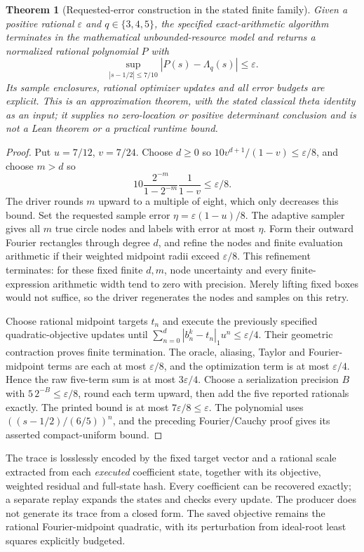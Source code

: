 \documentclass[11pt]{article}
\newtheorem{theorem}{Theorem}[section]
\theoremstyle{definition}\newtheorem{definition}[theorem]{Definition}
\theoremstyle{remark}\newtheorem{remark}[theorem]{Remark}
\begin{document}
\begin{theorem}[Requested-error construction in the stated finite family]\label{at:requested}
Given a positive rational $\varepsilon$ and $q\in\{3,4,5\}$, the specified
exact-arithmetic algorithm terminates in the mathematical unbounded-resource
model and returns a normalized rational polynomial $P$ with
\[
 \sup_{|s-1/2|\le7/10}|P(s)-\Lambda_q(s)|\le\varepsilon.
\]
Its sample enclosures, rational optimizer updates and all error budgets are
explicit. This is an approximation theorem, with the stated classical theta
identity as an input; it supplies no zero-location or positive determinant
conclusion and is not a Lean theorem or a practical runtime bound.
\end{theorem}
\begin{proof}
Put $u=7/12$, $v=7/24$. Choose $d\ge0$ so
$10v^{d+1}/(1-v)\le\varepsilon/8$, and choose $m>d$ so
\[
 10\frac{2^{-m}}{1-2^{-m}}\frac1{1-v}\le\varepsilon/8.
\]
The driver rounds $m$ upward to a multiple of eight, which only decreases
this bound. Set the requested sample error
$\eta=\varepsilon(1-u)/8$. The adaptive sampler gives all $m$ true circle
nodes and labels with error at most $\eta$. Form their outward Fourier
rectangles through degree $d$, and refine the nodes and finite evaluation
arithmetic if their weighted midpoint radii exceed $\varepsilon/8$.
This refinement terminates: for these fixed finite $d,m$, node uncertainty
and every finite-expression arithmetic width tend to zero with precision.
Merely lifting fixed boxes would not suffice, so the driver regenerates the
nodes and samples on this retry.

Choose rational midpoint targets $t_n$ and execute the previously specified
quadratic-objective updates until
$\sum_{n=0}^d|b_n^k-t_n|_1u^n\le\varepsilon/4$.
Their geometric contraction proves finite termination. The oracle,
aliasing, Taylor and Fourier-midpoint terms are each at most
$\varepsilon/8$, and the optimization term is at most $\varepsilon/4$.
Hence the raw five-term sum is at most $3\varepsilon/4$.
Choose a serialization precision $B$ with $5\,2^{-B}\le\varepsilon/8$,
round each term upward, then add the five reported rationals exactly.
The printed bound is at most $7\varepsilon/8\le\varepsilon$.
The polynomial uses $((s-1/2)/(6/5))^n$, and the preceding Fourier/Cauchy
proof gives its asserted compact-uniform bound.
\end{proof}

The trace is losslessly encoded by the fixed target vector and a rational
scale extracted from each \emph{executed} coefficient state, together with
its objective, weighted residual and full-state hash. Every coefficient
can be recovered exactly; a separate replay expands the states and checks
every update. The producer does not generate its trace from a closed form.
The saved objective remains the rational Fourier-midpoint quadratic, with
its perturbation from ideal-root least squares explicitly budgeted.
\end{document}
